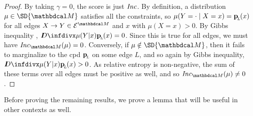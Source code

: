 \begin{proof}
	 By taking $\gamma = 0$, the score is just $\mathit{Inc}$. By
			 definition, a distribution $\mu \in \SD{\dg M}$ satisfies
	  all the
			 constraints, so $\mu(Y = \cdot \mid X=x) =
			 \mathbf{p}_{\!_{L}\!}(x)$ for all edges $X \rightarrow Y \in \Ed^{\dg
			   M}$ and $x$ with 
			 $\mu(X=x)>0$. By Gibbs inequality
			 \cite{mackay2003information}, 
			 $\kldiv{\mu(Y|x)}{\bp(x)} = 0$. Since this is true
			 for all edges, we must have $\Inc_{\dg M}( \mu) =
			 0$. Conversely, if $\mu \notin \SD{\dg M}$, then it
			 fails to marginalize to the cpd $\mathbf{p}_{\!_{L}\!}$ on some edge
							  $L$, and so again by Gibbs inequality,
			 $\kldiv{\mu(Y|x)}{\bp(x)} > 0$. As relative entropy
			 is non-negative, the sum of these terms over all
			 edges must be positive as well, and so $\Inc_{\dg M}(
			 \mu) \neq 0$. %
\end{proof}


Before proving the remaining results, we prove a lemma that will be useful
in other contexts as well. 

